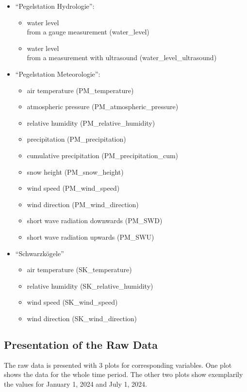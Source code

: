 \documentclass[a4paper,12pt]{article}
\begin{document}
\begin{itemize}
    \item ``Pegelstation Hydrologie'':
        \begin{itemize}
            \item water level\\from a gauge measurement (water\_level)
            \item water level\\from a measurement with ultrasound (water\_level\_ultrasound)
        \end{itemize}
    \item ``Pegelstation Meteorologie'':
        \begin{itemize}
            \item air temperature (PM\_temperature)
            \item atmospheric pressure (PM\_atmospheric\_pressure)
            \item relative humidity (PM\_relative\_humidity)
            \item precipitation (PM\_precipitation)
            \item cumulative precipitation (PM\_precipitation\_cum)
            \item snow height (PM\_snow\_height)
            \item wind speed (PM\_wind\_speed)
            \item wind direction (PM\_wind\_direction)
            \item short wave radiation downwards (PM\_SWD)
            \item short wave radiation upwards (PM\_SWU)
        \end{itemize}
    \item ``Schwarzkögele''
        \begin{itemize}
            \item air temperature (SK\_temperature)
            \item relative humidity (SK\_relative\_humidity)
            \item wind speed (SK\_wind\_speed)
            \item wind direction (SK\_wind\_direction)
        \end{itemize}
\end{itemize}

\subsection{Presentation of the Raw Data}
The raw data is presented with 3 plots for corresponding variables. One plot shows the data for the whole time period. The other two plots show exemplarily the values for January 1, 2024 and July 1, 2024.
\end{document}
